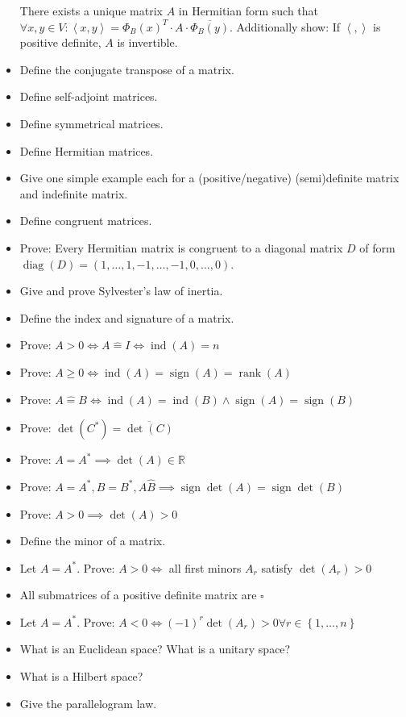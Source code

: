 \documentclass[a4paper]{article}
\newcommand{\set}[1]{\left\{#1\right\}}
\newcommand{\angel}[1]{\left\langle#1\right\rangle}
\DeclareMathOperator{\sign}{sign}
\begin{document}
\begin{itemize}
    There exists a unique matrix $A$ in Hermitian form such that $\forall x,y \in V: \angel{x,y} = \Phi_B(x)^T \cdot A \cdot \overline{\Phi_B(y)}$.
    Additionally show: If $\angel{,}$ is positive definite, $A$ is invertible.
  \item Define the conjugate transpose of a matrix.
  \item Define self-adjoint matrices.
  \item Define symmetrical matrices.
  \item Define Hermitian matrices.
  \item Give one simple example each for a (positive/negative) (semi)definite matrix and indefinite matrix.
  \item Define congruent matrices.
  \item Prove: Every Hermitian matrix is congruent to a diagonal matrix $D$ of form $\operatorname{diag}(D) = (1, \dots, 1, -1, \dots, -1, 0, \dots, 0)$.
  \item Give and prove Sylvester's law of inertia.
  \item Define the index and signature of a matrix.
  \item Prove: $A > 0 \iff A \hat={} I \iff \operatorname{ind}(A) = n$
  \item Prove: $A \geq 0 \iff \operatorname{ind}(A) = \operatorname{sign}(A) = \operatorname{rank}(A)$
  \item Prove: $A \hat={} B \iff \operatorname{ind}(A) = \operatorname{ind}(B) \land \operatorname{sign}(A) = \operatorname{sign}(B)$
  \item Prove: $\det(C^*) = \overline{\det(C)}$
  \item Prove: $A = A^* \implies \det(A) \in \mathbb R$
  \item Prove: $A = A^*, B = B^*, A \hat B \implies \sign{\det(A)} = \sign{\det(B)}$
  \item Prove: $A > 0 \implies \det(A) > 0$
  \item Define the minor of a matrix.
  \item Let $A = A^*$. Prove: $A > 0 \iff$ all first minors $A_r$ satisfy $\det(A_r) > 0$
  \item All submatrices of a positive definite matrix are $\square$
  \item Let $A = A^*$. Prove: $A < 0 \iff (-1)^r \det(A_r) > 0 \forall r \in \set{1, \dots, n}$
  \item What is an Euclidean space? What is a unitary space?
  \item What is a Hilbert space?
  \item Give the parallelogram law.

\end{itemize}
\end{document}
